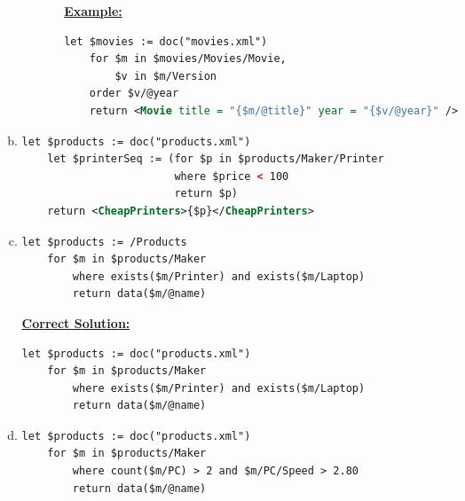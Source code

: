 \documentclass[12pt]{article}
\begin{document}
\begin{enumerate}[1.]
\begin{enumerate}[a)]
\begin{itemize}
\begin{itemize}
                \bigskip

                \underline{\textbf{Example:}}

    \begin{lstlisting}[language=XML]
    let $movies := doc("movies.xml")
    for $m in $movies/Movies/Movie,
        $v in $m/Version
    order $v/@year
    return <Movie title = "{$m/@title}" year = "{$v/@year}" />
    \end{lstlisting}
            \end{itemize}
        \end{itemize}

        \item

    \begin{lstlisting}[language=XML]
    let $products := doc("products.xml")
    let $printerSeq := (for $p in $products/Maker/Printer
                        where $price < 100
                        return $p)
    return <CheapPrinters>{$p}</CheapPrinters>
    \end{lstlisting}

        \item

    \begin{lstlisting}[language=XML]
    let $products := /Products
    for $m in $products/Maker
        where exists($m/Printer) and exists($m/Laptop)
        return data($m/@name)
    \end{lstlisting}

        \bigskip

    \begin{mdframed}
        \underline{\textbf{Correct Solution:}}

        \bigskip

    \begin{lstlisting}[language=XML]
    let $products := doc("products.xml")
    for $m in $products/Maker
        where exists($m/Printer) and exists($m/Laptop)
        return data($m/@name)
    \end{lstlisting}
    \end{mdframed}

        \item

    \begin{lstlisting}[language=XML]
    let $products := doc("products.xml")
    for $m in $products/Maker
        where count($m/PC) > 2 and $m/PC/Speed > 2.80
        return data($m/@name)
    \end{lstlisting}

    \end{enumerate}
\end{enumerate}
\end{document}
